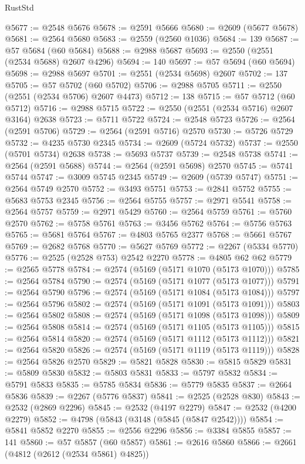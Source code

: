 \begin{lexlean}{RustStd}
\begin{coremodule}
@5677 := @2548 @5676
@5678 := @2591 @5666
@5680 := @2609 (@5677 @5678)
@5681 := @2564 @5680
@5683 := @2559 (@2560 @1036)
@5684 := 139
@5687 := @57 @5684 (@60 @5684)
@5688 := @2988 @5687
@5693 := @2550 (@2551 (@2534 @5688) @2607 @4296)
@5694 := 140
@5697 := @57 @5694 (@60 @5694)
@5698 := @2988 @5697
@5701 := @2551 (@2534 @5698) @2607
@5702 := 137
@5705 := @57 @5702 (@60 @5702)
@5706 := @2988 @5705
@5711 := @2550 (@2551 (@2534 @5706) @2607 @4473)
@5712 := 138
@5715 := @57 @5712 (@60 @5712)
@5716 := @2988 @5715
@5722 := @2550 (@2551 (@2534 @5716) @2607 @3164) @2638
@5723 := @5711 @5722
@5724 := @2548 @5723
@5726 := @2564 (@2591 @5706)
@5729 := @2564 (@2591 @5716) @2570
@5730 := @5726 @5729
@5732 := @4235 @5730 @2345
@5734 := @2609 (@5724 @5732)
@5737 := @2550 (@5701 @5734) @2638
@5738 := @5693 @5737
@5739 := @2548 @5738
@5741 := @2564 (@2591 @5688)
@5744 := @2564 (@2591 @5698) @2570
@5745 := @5741 @5744
@5747 := @3009 @5745 @2345
@5749 := @2609 (@5739 @5747)
@5751 := @2564 @5749 @2570
@5752 := @3493 @5751
@5753 := @2841 @5752
@5755 := @5683 @5753 @2345
@5756 := @2564 @5755
@5757 := @2971 @5541
@5758 := @2564 @5757
@5759 := @2971 @5429
@5760 := @2564 @5759
@5761 := @5760 @2570
@5762 := @5758 @5761
@5763 := @3456 @5762
@5764 := @5756 @5763
@5765 := @5681 @5764
@5767 := @4803 @5765 @2377
@5768 := @5661 @5767
@5769 := @2682 @5768
@5770 := @5627 @5769
@5772 := @2267 (@5334 @5770)
@5776 := @2525 (@2528 @753) @2542 @2270
@5778 := @4805 @62 @62
@5779 := @2565 @5778
@5784 := @2574 (@5169 (@5171 @1070 (@5173 @1070)))
@5785 := @2564 @5784
@5790 := @2574 (@5169 (@5171 @1077 (@5173 @1077)))
@5791 := @2564 @5790
@5796 := @2574 (@5169 (@5171 @1084 (@5173 @1084)))
@5797 := @2564 @5796
@5802 := @2574 (@5169 (@5171 @1091 (@5173 @1091)))
@5803 := @2564 @5802
@5808 := @2574 (@5169 (@5171 @1098 (@5173 @1098)))
@5809 := @2564 @5808
@5814 := @2574 (@5169 (@5171 @1105 (@5173 @1105)))
@5815 := @2564 @5814
@5820 := @2574 (@5169 (@5171 @1112 (@5173 @1112)))
@5821 := @2564 @5820
@5826 := @2574 (@5169 (@5171 @1119 (@5173 @1119)))
@5828 := @2564 @5826 @2570
@5829 := @5821 @5828
@5830 := @5815 @5829
@5831 := @5809 @5830
@5832 := @5803 @5831
@5833 := @5797 @5832
@5834 := @5791 @5833
@5835 := @5785 @5834
@5836 := @5779 @5835
@5837 := @2664 @5836
@5839 := @2267 (@5776 @5837)
@5841 := @2525 (@2528 @830)
@5843 := @2532 (@2869 @2296)
@5845 := @2532 (@4197 @2279)
@5847 := @2532 (@4200 @2279)
@5852 := @4798 (@5843 (@3148 (@5845 (@5847 @2542))))
@5854 := @5841 @5852 @2270
@5855 := @2556 @2296
@5856 := @3384 @5855
@5857 := 141
@5860 := @57 @5857 (@60 @5857)
@5861 := @2616 @5860
@5866 := @2661 (@4812 (@2612 (@2534 @5861) @4825))

\end{coremodule}
\end{lexlean}

